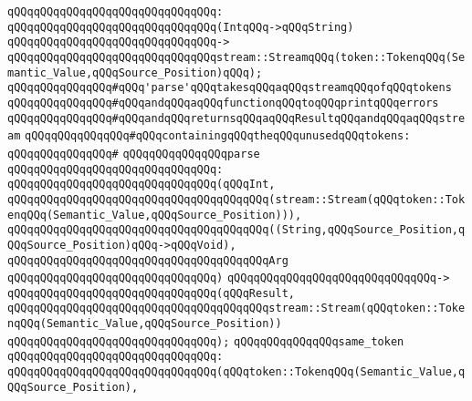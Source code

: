 \verb|qQQqqQQqqQQqqQQqqQQqqQQqqQQqqQQq:|\newline
\verb|qQQqqQQqqQQqqQQqqQQqqQQqqQQqqQQq(IntqQQq->qQQqString)|\newline
\verb|qQQqqQQqqQQqqQQqqQQqqQQqqQQqqQQq->|\newline
\verb|qQQqqQQqqQQqqQQqqQQqqQQqqQQqqQQqstream::StreamqQQq(token::TokenqQQq(Semantic_Value,qQQqSource_Position)qQQq);|\newline
\newline
\verb|qQQqqQQqqQQqqQQq#qQQq'parse'qQQqtakesqQQqaqQQqstreamqQQqofqQQqtokens|\newline
\verb|qQQqqQQqqQQqqQQq#qQQqandqQQqaqQQqfunctionqQQqtoqQQqprintqQQqerrors|\newline
\verb|qQQqqQQqqQQqqQQq#qQQqandqQQqreturnsqQQqaqQQqResultqQQqandqQQqaqQQqstream|\newline
\verb|qQQqqQQqqQQqqQQq#qQQqcontainingqQQqtheqQQqunusedqQQqtokens:|\newline
\verb|qQQqqQQqqQQqqQQq#|\newline
\verb|qQQqqQQqqQQqqQQqparse|\newline
\verb|qQQqqQQqqQQqqQQqqQQqqQQqqQQqqQQq:|\newline
\verb|qQQqqQQqqQQqqQQqqQQqqQQqqQQqqQQq(qQQqInt,|\newline
\verb|qQQqqQQqqQQqqQQqqQQqqQQqqQQqqQQqqQQqqQQq(stream::Stream(qQQqtoken::TokenqQQq(Semantic_Value,qQQqSource_Position))),|\newline
\verb|qQQqqQQqqQQqqQQqqQQqqQQqqQQqqQQqqQQqqQQq((String,qQQqSource_Position,qQQqSource_Position)qQQq->qQQqVoid),|\newline
\verb|qQQqqQQqqQQqqQQqqQQqqQQqqQQqqQQqqQQqqQQqArg|\newline
\verb|qQQqqQQqqQQqqQQqqQQqqQQqqQQqqQQq)|\newline
\verb|qQQqqQQqqQQqqQQqqQQqqQQqqQQqqQQq->|\newline
\verb|qQQqqQQqqQQqqQQqqQQqqQQqqQQqqQQq(qQQqResult,|\newline
\verb|qQQqqQQqqQQqqQQqqQQqqQQqqQQqqQQqqQQqqQQqstream::Stream(qQQqtoken::TokenqQQq(Semantic_Value,qQQqSource_Position))|\newline
\verb|qQQqqQQqqQQqqQQqqQQqqQQqqQQqqQQq);|\newline
\newline
\verb|qQQqqQQqqQQqqQQqsame_token|\newline
\verb|qQQqqQQqqQQqqQQqqQQqqQQqqQQqqQQq:|\newline
\verb|qQQqqQQqqQQqqQQqqQQqqQQqqQQqqQQq(qQQqtoken::TokenqQQq(Semantic_Value,qQQqSource_Position),|\newline

